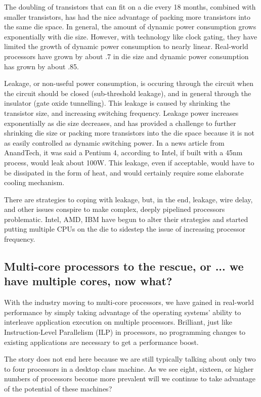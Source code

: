 \documentclass[12pt,twoside,letterpaper]{article}
\begin{document}
The doubling of transistors that can fit on a die every 18 months, combined with smaller transistors, has had the nice advantage of packing more transistors into the same die space. In general, the amount of dynamic power consumption grows exponentially with die size. However, with technology like clock gating, they have limited the growth of dynamic power consumption to nearly linear. Real-world processors have grown by about .7 in die size and dynamic power consumption has grown by about .85. 

Leakage, or non-useful power consumption, is occuring through the circuit when the circuit should be closed (sub-threshold leakage), and in general through the insulator (gate oxide tunnelling). This leakage is caused by shrinking the transistor size, and increasing switching frequency. Leakage power increases exponentially as die size decreases, and has provided a challenge to further shrinking die size or packing more transistors into the die space because it is not as easily controlled as dynamic switching power. In a news article from AnandTech, it was said a Pentium 4, according to Intel, if built with a 45nm process, would leak about 100W. This leakage, even if acceptable, would have to be dissipated in the form of heat, and would certainly require some elaborate cooling mechanism.

There are strategies to coping with leakage, but, in the end, leakage, wire delay, and other issues conspire to make complex, deeply pipelined processors problematic. Intel, AMD, IBM have begun to alter their strategies and started putting multiple CPUs on the die to sidestep the issue of increasing processor frequency.

\subsection*{Multi-core processors to the rescue, or ... we have multiple cores, now what?}
With the industry moving to multi-core processors, we have gained in real-world performance by simply taking advantage of the operating systems' ability to interleave application execution on multiple processors. Brilliant, just like Instruction-Level Parallelism (ILP) in processors, no programming changes to existing applications are necessary to get a performance boost.

The story does not end here because we are still typically talking about only two to four processors in a desktop class machine. As we see eight, sixteen, or higher numbers of processors become more prevalent will we continue to take advantage of the potential of these machines?
\end{document}
